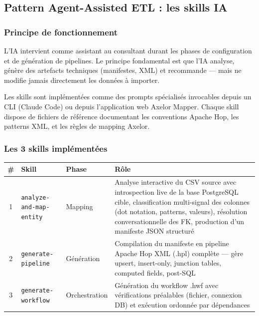 \documentclass[a4paper,12pt]{article}
\begin{document}
\subsection{Pattern Agent-Assisted ETL : les skills IA}

\subsubsection{Principe de fonctionnement}

L'IA intervient comme assistant au consultant durant les phases de configuration et de génération de pipelines. Le principe fondamental est que l'IA analyse, génère des artefacts techniques (manifestes, XML) et recommande — mais ne modifie jamais directement les données à importer.

Les skills sont implémentées comme des prompts spécialisés invocables depuis un CLI (Claude Code) ou depuis l'application web Axelor Mapper. Chaque skill dispose de fichiers de référence documentant les conventions Apache Hop, les patterns XML, et les règles de mapping Axelor.

\subsubsection{Les 3 skills implémentées}

\begin{center}
\begin{tabular}{|c|p{}|p{}|p{}|}
\hline
\textbf{\#} & \textbf{Skill} & \textbf{Phase} & \textbf{Rôle} \\
\hline
1 & \texttt{analyze-and-map-entity} & Mapping & Analyse interactive du CSV source avec introspection live de la base PostgreSQL cible, classification multi-signal des colonnes (dot notation, patterns, valeurs), résolution conversationnelle des FK, production d'un manifeste JSON structuré \\
\hline
2 & \texttt{generate-pipeline} & Génération & Compilation du manifeste en pipeline Apache Hop XML (.hpl) complète — gère upsert, insert-only, junction tables, computed fields, post-SQL \\
\hline
3 & \texttt{generate-workflow} & Orchestration & Génération du workflow .hwf avec vérifications préalables (fichier, connexion DB) et exécution ordonnée par dépendances \\
\hline
\end{tabular}
\end{center}
\end{document}
